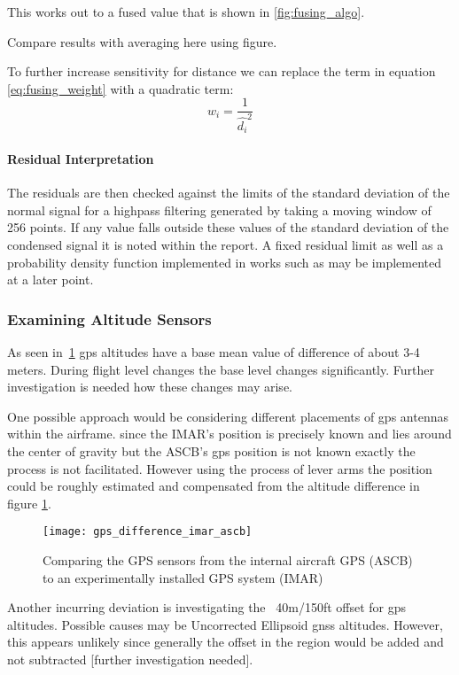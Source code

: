 This works out to a fused value that is shown in \ref{fig:fusing_algo}.

Compare results with averaging here using figure.

To further increase sensitivity for distance we can replace the term in equation \ref{eq:fusing_weight} with a quadratic term:
\begin{equation}
        w_i=\frac{1}{\hat{d_i}^2}
\end{equation}
\paragraph{Residual Interpretation}


The residuals are then checked against the limits of the standard deviation of the normal signal for a highpass filtering generated by taking a moving window of 256 points. If any value falls outside these values of the standard deviation of the condensed signal it is noted within the report. A fixed residual limit as well as a probability density function implemented in works such as \cite{svard_data-driven_2014} may be implemented at a later point.

\subsubsection{Examining Altitude Sensors}

As seen in~\ref{fig:gps_diff} gps altitudes have a base mean value of difference of about 3-4 meters. During flight level changes the base level changes significantly. Further investigation is needed how these changes may arise.

One possible approach would be considering different placements of gps antennas within the airframe. since the IMAR's position is precisely known and lies around the center of gravity but the ASCB's gps position is not known exactly the process is not facilitated. However using the process of lever arms the position could be roughly estimated and compensated from the altitude difference in figure \ref{fig:gps_diff}.

\begin{figure}[h]
    \centering
    \texttt{[image: gps\_difference\_imar\_ascb]}
    \caption{Comparing the GPS sensors from the internal aircraft GPS (ASCB) to an experimentally installed GPS system (IMAR)}
    \label{fig:gps_diff}
\end{figure}

Another incurring deviation is investigating the ~40m/150ft offset for gps altitudes. Possible causes may be Uncorrected Ellipsoid gnss altitudes. However, this appears unlikely since generally the offset in the region would be added and not subtracted [further investigation needed].


